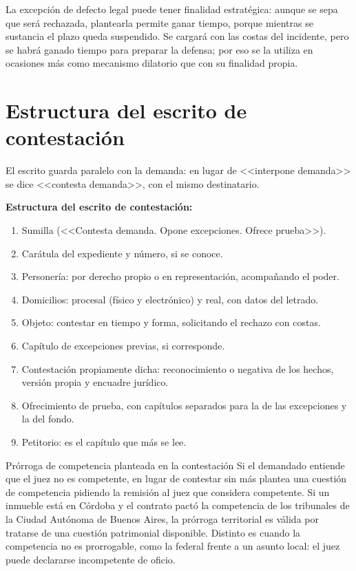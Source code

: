 \documentclass[12pt,oneside]{book}
\begin{document}
\begin{note}
La excepción de defecto legal puede tener finalidad estratégica: aunque se sepa que será rechazada, plantearla permite ganar tiempo, porque mientras se sustancia el plazo queda suspendido. Se cargará con las costas del incidente, pero se habrá ganado tiempo para preparar la defensa; por eso se la utiliza en ocasiones más como mecanismo dilatorio que con su finalidad propia.
\end{note}

\section{Estructura del escrito de contestación}

El escrito guarda paralelo con la demanda: en lugar de <<interpone demanda>> se dice <<contesta demanda>>, con el mismo destinatario.

\begin{important}
\textbf{Estructura del escrito de contestación:}
\begin{enumerate}
\item Sumilla (<<Contesta demanda. Opone excepciones. Ofrece prueba>>).
\item Carátula del expediente y número, si se conoce.
\item Personería: por derecho propio o en representación, acompañando el poder.
\item Domicilios: procesal (físico y electrónico) y real, con datos del letrado.
\item Objeto: contestar en tiempo y forma, solicitando el rechazo con costas.
\item Capítulo de excepciones previas, si corresponde.
\item Contestación propiamente dicha: reconocimiento o negativa de los hechos, versión propia y encuadre jurídico.
\item Ofrecimiento de prueba, con capítulos separados para la de las excepciones y la del fondo.
\item Petitorio: es el capítulo que más se lee.
\end{enumerate}
\end{important}

\begin{example}{Prórroga de competencia planteada en la contestación}
Si el demandado entiende que el juez no es competente, en lugar de contestar sin más plantea una cuestión de competencia pidiendo la remisión al juez que considera competente. Si un inmueble está en Córdoba y el contrato pactó la competencia de los tribunales de la Ciudad Autónoma de Buenos Aires, la prórroga territorial es válida por tratarse de una cuestión patrimonial disponible. Distinto es cuando la competencia no es prorrogable, como la federal frente a un asunto local: el juez puede declararse incompetente de oficio.
\end{example}
\end{document}
